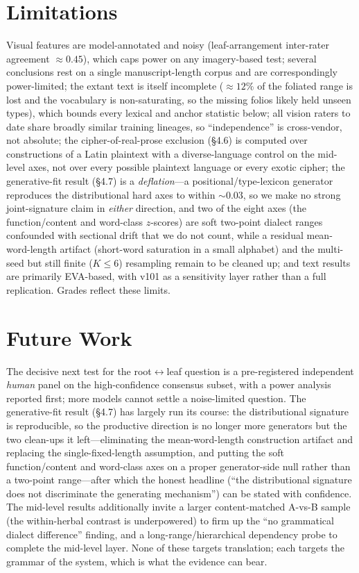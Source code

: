 \documentclass[11pt]{article}
\begin{document}
\section{Limitations}
Visual features are model-annotated and noisy (leaf-arrangement inter-rater agreement
$\approx 0.45$), which caps power on any imagery-based test; several conclusions rest
on a single manuscript-length corpus and are correspondingly power-limited; the extant
text is itself incomplete ($\approx\!12\%$ of the foliated range is lost and the
vocabulary is non-saturating, so the missing folios likely held unseen types), which
bounds every lexical and anchor statistic below; all vision raters to date share
broadly similar training lineages, so ``independence'' is cross-vendor, not absolute;
the cipher-of-real-prose exclusion (\S4.6) is computed over constructions of a Latin
plaintext with a diverse-language control on the mid-level axes, not over every possible
plaintext language or every exotic cipher; the generative-fit result (\S4.7) is a
\emph{deflation}---a positional/type-lexicon generator reproduces the distributional hard
axes to within $\sim\!0.03$, so we make no strong joint-signature claim in \emph{either}
direction, and two of the eight axes (the function/content and word-class $z$-scores) are
soft two-point dialect ranges confounded with sectional drift that we do not count, while a
residual mean-word-length artifact (short-word saturation in a small alphabet) and the
multi-seed but still finite ($K\!\leq\!6$) resampling remain to be cleaned up; and text
results are primarily EVA-based,
with v101 as a sensitivity layer rather than a full replication. Grades reflect these
limits.

\section{Future Work}
The decisive next test for the root$\leftrightarrow$leaf question is a pre-registered
independent \emph{human} panel on the high-confidence consensus subset, with a power
analysis reported first; more models cannot settle a noise-limited question. The
generative-fit result (\S4.7) has largely run its course: the distributional signature is
reproducible, so the productive direction is no longer more generators but the two clean-ups
it left---eliminating the mean-word-length construction artifact and replacing the
single-fixed-length assumption, and putting the soft function/content and word-class axes on
a proper generator-side null rather than a two-point range---after which the honest headline
(``the distributional signature does not discriminate the generating mechanism'') can be
stated with confidence. The mid-level results additionally
invite a larger content-matched A-vs-B sample (the within-herbal contrast is
underpowered) to firm up the ``no grammatical dialect difference'' finding, and a
long-range/hierarchical dependency probe to complete the mid-level layer. None of these
targets translation; each targets the grammar of the system, which is what the evidence
can bear.
\end{document}
